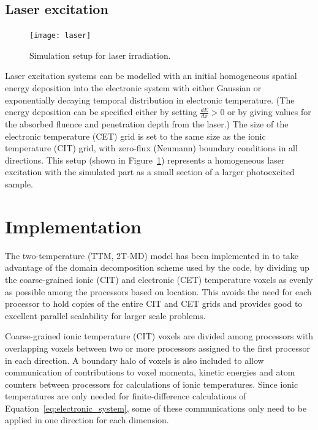 \subsection*{Laser excitation}

\begin{figure}[h] 
	\centering
	{
		\texttt{[image: laser]}
	}
	\caption{Simulation setup for laser irradiation.}
	\label{fig:laser}
\end{figure}
Laser excitation systems can be modelled with an initial homogeneous
spatial energy deposition into the electronic system with either Gaussian 
or exponentially decaying temporal distribution in electronic temperature. 
(The energy deposition can be specified either by setting $\frac{dE}{dx} > 0$ 
or by giving values for the absorbed fluence and penetration depth from the 
laser.) The size of the electronic temperature (CET) grid is set to the same 
size as the ionic temperature (CIT) grid, with zero-flux (Neumann) boundary 
conditions in all directions. This setup (shown in Figure~\ref{fig:laser}) 
represents a homogeneous laser excitation with the simulated part as a 
small section of a larger photoexcited sample.

\section{Implementation}

The two-temperature (TTM, 2T-MD) model has been implemented in \D
to take advantage of the domain decomposition scheme used by the code,
by dividing up the coarse-grained ionic (CIT) and electronic (CET) 
temperature voxels as evenly as possible among the processors based on 
location. This avoids the need for each processor to hold copies of the 
entire CIT and CET grids and provides good to excellent parallel scalability 
for larger scale problems.

Coarse-grained ionic temperature (CIT) voxels are divided among processors 
with overlapping voxels between two or more processors assigned to the 
first processor in each direction. A boundary halo of voxels is also included 
to allow communication of contributions to voxel momenta, kinetic energies and 
atom counters between processors for calculations of ionic temperatures. Since 
ionic temperatures are only needed for finite-difference calculations of 
Equation~\ref{eq:electronic_system}, some of these communications only 
need to be applied in one direction for each dimension. 

